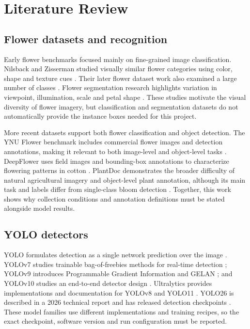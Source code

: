 \documentclass[conference]{IEEEtran}
\begin{document}
\section{Literature Review}
\subsection{Flower datasets and recognition}
Early flower benchmarks focused mainly on fine-grained image classification. Nilsback and Zisserman studied visually similar flower categories using color, shape and texture cues \cite{nilsback2006vocabulary}. Their later flower dataset work also examined a large number of classes \cite{nilsback2008classification}. Flower segmentation research highlights variation in viewpoint, illumination, scale and petal shape \cite{nilsback2007segmentation}. These studies motivate the visual diversity of flower imagery, but classification and segmentation datasets do not automatically provide the instance boxes needed for this project.

More recent datasets support both flower classification and object detection. The YNU Flower benchmark includes commercial flower images and detection annotations, making it relevant to both image-level and object-level tasks \cite{yu2024ynu}. DeepFlower uses field images and bounding-box annotations to characterize flowering patterns in cotton \cite{jiang2020deepflower}. PlantDoc demonstrates the broader difficulty of natural agricultural imagery and object-level plant annotation, although its main task and labels differ from single-class bloom detection \cite{singh2020plantdoc}. Together, this work shows why collection conditions and annotation definitions must be stated alongside model results.

\subsection{YOLO detectors}
YOLO formulates detection as a single network prediction over the image \cite{redmon2016yolo}. YOLOv7 studies trainable bag-of-freebies methods for real-time detection \cite{wang2022yolov7}; YOLOv9 introduces Programmable Gradient Information and GELAN \cite{wang2024yolov9}; and YOLOv10 studies an end-to-end detector design \cite{wang2024yolov10}. Ultralytics provides implementations and documentation for YOLOv8 and YOLO11 \cite{ultralytics2023yolov8,ultralytics2024yolo11}. YOLO26 is described in a 2026 technical report and has released detection checkpoints \cite{jocher2026yolo26}. These model families use different implementations and training recipes, so the exact checkpoint, software version and run configuration must be reported.
\end{document}
